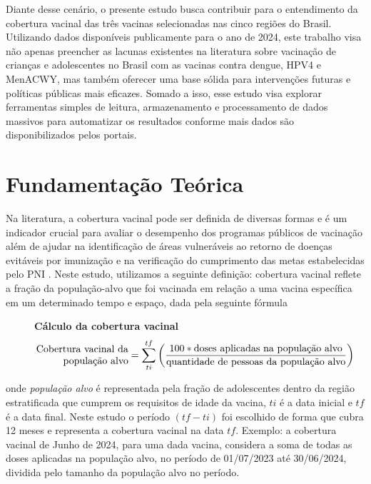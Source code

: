 \documentclass[12pt]{article}
\begin{document}
Diante desse cenário, o presente estudo busca contribuir para o entendimento da cobertura vacinal das três vacinas selecionadas nas cinco regiões do Brasil. Utilizando dados disponíveis publicamente para o ano de 2024, este trabalho visa não apenas preencher as lacunas existentes na literatura sobre vacinação de crianças e adolescentes no Brasil com as vacinas contra dengue, HPV4 e MenACWY, mas também oferecer uma base sólida para intervenções futuras e políticas públicas mais eficazes. Somado a isso, esse estudo visa explorar ferramentas simples de leitura, armazenamento e processamento de dados massivos para automatizar os resultados conforme mais dados são disponibilizados pelos portais.

\section{Fundamentação Teórica} \label{sec:fundamentacao teorica}
Na literatura, a cobertura vacinal pode ser definida de diversas formas \cite{pamplona_imunizacao_2020} e é um indicador crucial para avaliar o desempenho dos programas públicos de vacinação além de ajudar na identificação de áreas vulneráveis ao retorno de doenças evitáveis por imunização e na verificação do cumprimento das metas estabelecidas pelo PNI \cite{observatorio_das_vacinas_mapa_2020}.
Neste estudo, utilizamos a seguinte definição: cobertura vacinal reflete a fração da população-alvo que foi vacinada em relação a uma vacina específica em um determinado tempo e espaço, dada pela seguinte fórmula

\begin{figure}[ht]
    \centering
    \textbf{Cálculo da cobertura vacinal}
    \[
        \parbox[ht]{3.3cm}{\raggedleft Cobertura vacinal da população alvo} =
        \sum_{ti}^{tf}
        {\left(\frac{100 * \mbox{doses aplicadas na população alvo}}{\mbox{quantidade de pessoas da população alvo}}\right)}
    \]
\end{figure}

onde \emph{população alvo} é representada pela fração de adolescentes dentro da região estratificada que cumprem os requisitos de idade da vacina, $ti$ é a data inicial e $tf$ é a data final. Neste estudo o período $(tf-ti)$ foi escolhido de forma que cubra 12 meses e representa a cobertura vacinal na data $tf$. Exemplo: a cobertura vacinal de Junho de 2024, para uma dada vacina, considera a soma de todas as doses aplicadas na população alvo, no período de 01/07/2023 até 30/06/2024, dividida pelo tamanho da população alvo no período.
\end{document}
